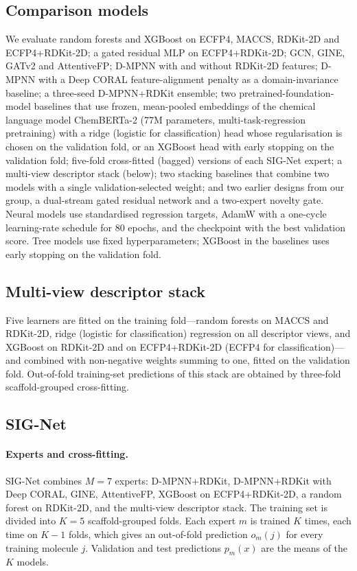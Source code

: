 \subsection{Comparison models}
We evaluate random forests and XGBoost on ECFP4, MACCS, RDKit-2D and ECFP4+RDKit-2D; a gated residual MLP on ECFP4+RDKit-2D; GCN\cite{kipf2017semi}, GINE\cite{xu2019powerful}, GATv2\cite{brody2022attentive} and AttentiveFP\cite{xiong2020pushing}; D-MPNN\cite{yang2019analyzing} with and without RDKit-2D features; D-MPNN with a Deep CORAL\cite{sun2016deep} feature-alignment penalty as a domain-invariance baseline; a three-seed D-MPNN+RDKit ensemble\cite{lakshminarayanan2017simple}; two pretrained-foundation-model baselines that use frozen, mean-pooled embeddings of the chemical language model ChemBERTa-2 (77M parameters, multi-task-regression pretraining\cite{ahmad2022chemberta2}) with a ridge (logistic for classification) head whose regularisation is chosen on the validation fold, or an XGBoost head with early stopping on the validation fold; five-fold cross-fitted (bagged) versions of each SIG-Net expert; a multi-view descriptor stack (below); two stacking baselines that combine two models with a single validation-selected weight; and two earlier designs from our group, a dual-stream gated residual network and a two-expert novelty gate. Neural models use standardised regression targets, AdamW with a one-cycle learning-rate schedule for 80 epochs, and the checkpoint with the best validation score. Tree models use fixed hyperparameters; XGBoost in the baselines uses early stopping on the validation fold.

\subsection{Multi-view descriptor stack}
Five learners are fitted on the training fold---random forests on MACCS and RDKit-2D, ridge (logistic for classification) regression on all descriptor views, and XGBoost on RDKit-2D and on ECFP4+RDKit-2D (ECFP4 for classification)---and combined with non-negative weights summing to one, fitted on the validation fold. Out-of-fold training-set predictions of this stack are obtained by three-fold scaffold-grouped cross-fitting.

\subsection{SIG-Net}
\paragraph{Experts and cross-fitting.} SIG-Net combines $M = 7$ experts: D-MPNN+RDKit, D-MPNN+RDKit with Deep CORAL, GINE, AttentiveFP, XGBoost on ECFP4+RDKit-2D, a random forest on RDKit-2D, and the multi-view descriptor stack. The training set is divided into $K = 5$ scaffold-grouped folds. Each expert $m$ is trained $K$ times, each time on $K-1$ folds, which gives an out-of-fold prediction $o_m(j)$ for every training molecule $j$. Validation and test predictions $p_m(x)$ are the means of the $K$ models.

